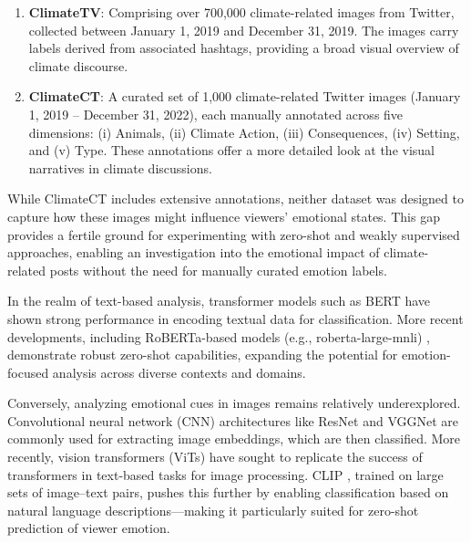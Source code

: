 \begin{enumerate}
    \item \textbf{ClimateTV}: Comprising over 700,000 climate-related images from Twitter, collected between January 1, 2019 and December 31, 2019. The images carry labels derived from associated hashtags, providing a broad visual overview of climate discourse.
    \item \textbf{ClimateCT}: A curated set of 1,000 climate-related Twitter images (January 1, 2019 – December 31, 2022), each manually annotated across five dimensions: (i) Animals, (ii) Climate Action, (iii) Consequences, (iv) Setting, and (v) Type. These annotations offer a more detailed look at the visual narratives in climate discussions.
\end{enumerate}

While ClimateCT includes extensive annotations, neither dataset was designed to capture how these images might influence viewers’ emotional states. This gap provides a fertile ground for experimenting with zero-shot and weakly supervised approaches, enabling an investigation into the emotional impact of climate-related posts without the need for manually curated emotion labels.
\newline

In the realm of text-based analysis, transformer models such as BERT \cite{DBLP:journals/corr/abs-1810-04805} have shown strong performance in encoding textual data for classification. More recent developments, including RoBERTa-based models (e.g., roberta-large-mnli) \cite{DBLP:journals/corr/abs-1907-11692}, demonstrate robust zero-shot capabilities, expanding the potential for emotion-focused analysis across diverse contexts and domains.
\newline

Conversely, analyzing emotional cues in images remains relatively underexplored. Convolutional neural network (CNN) architectures like ResNet \cite{he2015deepresiduallearningimage} and VGGNet \cite{simonyan2015deepconvolutionalnetworkslargescale} are commonly used for extracting image embeddings, which are then classified. More recently, vision transformers (ViTs) \cite{dosovitskiy2021imageworth16x16words} have sought to replicate the success of transformers in text-based tasks for image processing. CLIP \cite{radford2021learningtransferablevisualmodels}, trained on large sets of image–text pairs, pushes this further by enabling classification based on natural language descriptions—making it particularly suited for zero-shot prediction of viewer emotion.
\newline

